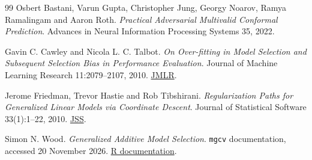 \documentclass[11pt,a4paper]{article}
\theoremstyle{definition}
\theoremstyle{remark}
\begin{document}
\begin{thebibliography}{99}
Osbert Bastani, Varun Gupta, Christopher Jung, Georgy Noarov, Ramya
Ramalingam and Aaron Roth.
\emph{Practical Adversarial Multivalid Conformal Prediction}.
Advances in Neural Information Processing Systems 35, 2022.

Gavin C. Cawley and Nicola L. C. Talbot.
\emph{On Over-fitting in Model Selection and Subsequent Selection Bias
in Performance Evaluation}.
Journal of Machine Learning Research 11:2079--2107, 2010.
\href{https://jmlr.org/papers/v11/cawley10a.html}{JMLR}.

Jerome Friedman, Trevor Hastie and Rob Tibshirani.
\emph{Regularization Paths for Generalized Linear Models via Coordinate Descent}.
Journal of Statistical Software 33(1):1--22, 2010.
\href{https://www.jstatsoft.org/article/view/v033i01}{JSS}.

Simon N. Wood.
\emph{Generalized Additive Model Selection}.
\texttt{mgcv} documentation, accessed 20 November 2026.
\href{https://stat.ethz.ch/R-manual/R-patched/library/mgcv/html/gam.selection.html}{R documentation}.

\end{thebibliography}
\end{document}
